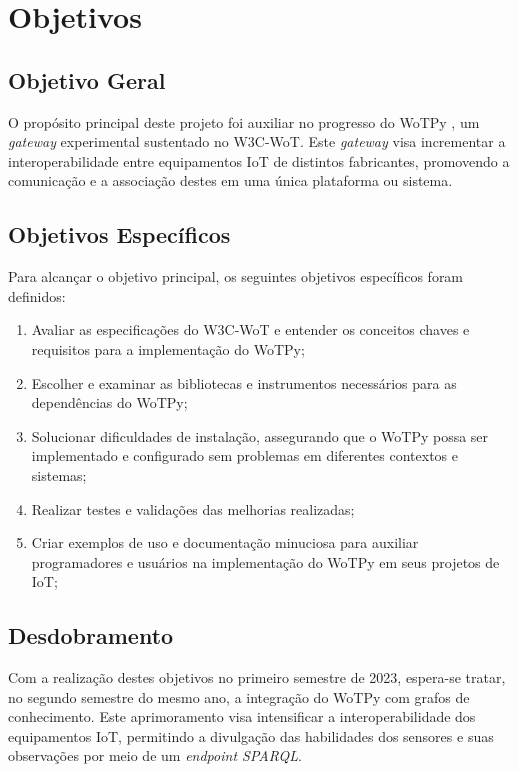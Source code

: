 \chapter{Objetivos}

\section{Objetivo Geral}

O propósito principal deste projeto foi auxiliar no progresso do WoTPy , um \textit{gateway} experimental sustentado no W3C-WoT. Este \textit{gateway} visa incrementar a interoperabilidade entre equipamentos IoT de distintos fabricantes, promovendo a comunicação e a associação destes em uma única plataforma ou sistema.

\section{Objetivos Específicos}

Para alcançar o objetivo principal, os seguintes objetivos específicos foram definidos:

\begin{enumerate}
\item Avaliar as especificações do W3C-WoT  e entender os conceitos chaves e requisitos para a implementação do WoTPy;
\item Escolher e examinar as bibliotecas e instrumentos necessários para as dependências do WoTPy;
\item Solucionar dificuldades de instalação, assegurando que o WoTPy possa ser implementado e configurado sem problemas em diferentes contextos e sistemas;
\item Realizar testes e validações das melhorias realizadas;
\item Criar exemplos de uso e documentação minuciosa para auxiliar programadores e usuários na implementação do WoTPy em seus projetos de IoT;
\end{enumerate}

\section{Desdobramento}

Com a realização destes objetivos no primeiro semestre de 2023, espera-se tratar, no segundo semestre do mesmo ano, a integração do WoTPy com grafos de conhecimento. Este aprimoramento visa intensificar a interoperabilidade dos equipamentos IoT, permitindo a divulgação das habilidades dos sensores e suas observações por meio de um \textit{endpoint SPARQL}.


